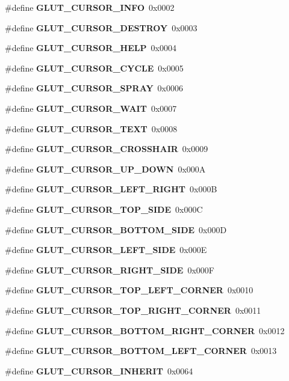 \begin{DoxyCompactItemize}
\item 
\#define {\bf G\+L\+U\+T\+\_\+\+C\+U\+R\+S\+O\+R\+\_\+\+I\+N\+F\+O}~0x0002
\item 
\#define {\bf G\+L\+U\+T\+\_\+\+C\+U\+R\+S\+O\+R\+\_\+\+D\+E\+S\+T\+R\+O\+Y}~0x0003
\item 
\#define {\bf G\+L\+U\+T\+\_\+\+C\+U\+R\+S\+O\+R\+\_\+\+H\+E\+L\+P}~0x0004
\item 
\#define {\bf G\+L\+U\+T\+\_\+\+C\+U\+R\+S\+O\+R\+\_\+\+C\+Y\+C\+L\+E}~0x0005
\item 
\#define {\bf G\+L\+U\+T\+\_\+\+C\+U\+R\+S\+O\+R\+\_\+\+S\+P\+R\+A\+Y}~0x0006
\item 
\#define {\bf G\+L\+U\+T\+\_\+\+C\+U\+R\+S\+O\+R\+\_\+\+W\+A\+I\+T}~0x0007
\item 
\#define {\bf G\+L\+U\+T\+\_\+\+C\+U\+R\+S\+O\+R\+\_\+\+T\+E\+X\+T}~0x0008
\item 
\#define {\bf G\+L\+U\+T\+\_\+\+C\+U\+R\+S\+O\+R\+\_\+\+C\+R\+O\+S\+S\+H\+A\+I\+R}~0x0009
\item 
\#define {\bf G\+L\+U\+T\+\_\+\+C\+U\+R\+S\+O\+R\+\_\+\+U\+P\+\_\+\+D\+O\+W\+N}~0x000\+A
\item 
\#define {\bf G\+L\+U\+T\+\_\+\+C\+U\+R\+S\+O\+R\+\_\+\+L\+E\+F\+T\+\_\+\+R\+I\+G\+H\+T}~0x000\+B
\item 
\#define {\bf G\+L\+U\+T\+\_\+\+C\+U\+R\+S\+O\+R\+\_\+\+T\+O\+P\+\_\+\+S\+I\+D\+E}~0x000\+C
\item 
\#define {\bf G\+L\+U\+T\+\_\+\+C\+U\+R\+S\+O\+R\+\_\+\+B\+O\+T\+T\+O\+M\+\_\+\+S\+I\+D\+E}~0x000\+D
\item 
\#define {\bf G\+L\+U\+T\+\_\+\+C\+U\+R\+S\+O\+R\+\_\+\+L\+E\+F\+T\+\_\+\+S\+I\+D\+E}~0x000\+E
\item 
\#define {\bf G\+L\+U\+T\+\_\+\+C\+U\+R\+S\+O\+R\+\_\+\+R\+I\+G\+H\+T\+\_\+\+S\+I\+D\+E}~0x000\+F
\item 
\#define {\bf G\+L\+U\+T\+\_\+\+C\+U\+R\+S\+O\+R\+\_\+\+T\+O\+P\+\_\+\+L\+E\+F\+T\+\_\+\+C\+O\+R\+N\+E\+R}~0x0010
\item 
\#define {\bf G\+L\+U\+T\+\_\+\+C\+U\+R\+S\+O\+R\+\_\+\+T\+O\+P\+\_\+\+R\+I\+G\+H\+T\+\_\+\+C\+O\+R\+N\+E\+R}~0x0011
\item 
\#define {\bf G\+L\+U\+T\+\_\+\+C\+U\+R\+S\+O\+R\+\_\+\+B\+O\+T\+T\+O\+M\+\_\+\+R\+I\+G\+H\+T\+\_\+\+C\+O\+R\+N\+E\+R}~0x0012
\item 
\#define {\bf G\+L\+U\+T\+\_\+\+C\+U\+R\+S\+O\+R\+\_\+\+B\+O\+T\+T\+O\+M\+\_\+\+L\+E\+F\+T\+\_\+\+C\+O\+R\+N\+E\+R}~0x0013
\item 
\#define {\bf G\+L\+U\+T\+\_\+\+C\+U\+R\+S\+O\+R\+\_\+\+I\+N\+H\+E\+R\+I\+T}~0x0064

\end{DoxyCompactItemize}
